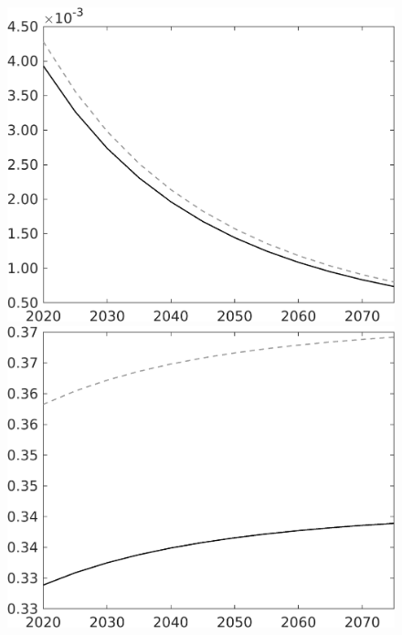 \documentclass[12pt]{article}
\begin{document}
\begin{figure}[h!!]
\begin{minipage}[]{0.32\textwidth}
	\end{minipage}	
	\begin{minipage}[]{0.32\textwidth}
		\includegraphics[width=1\textwidth]{../../codding_model/own_basedOnFried/optimalPol_010922_revision/figures/all_13Sept22/CompTaul_Equlab_LFBAU_Reg0_Lg_spillover0_nsk1_xgr0_knspil1_sep1_countec0_GovRev0_etaa0.79_lgd0.png}
	\end{minipage}	
	\begin{minipage}[]{0.32\textwidth}
		\includegraphics[width=1\textwidth]{../../codding_model/own_basedOnFried/optimalPol_010922_revision/figures/all_13Sept22/CompTaul_Equlab_LFBAU_Reg0_Ln_spillover0_nsk1_xgr0_knspil1_sep1_countec0_GovRev0_etaa0.79_lgd0.png}

\end{minipage}
\end{figure}
\end{document}
